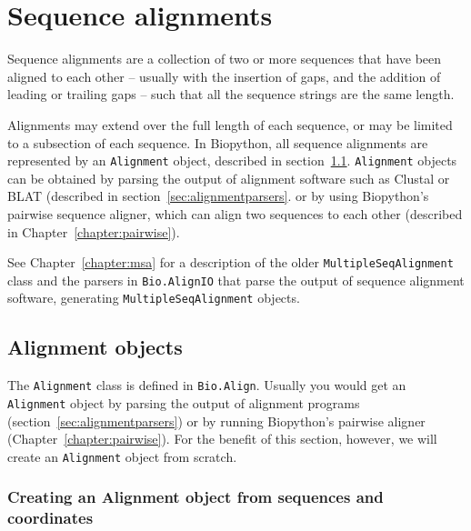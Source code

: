 \chapter{Sequence alignments}
\label{chapter:align}

Sequence alignments are a collection of two or more sequences that have been aligned to each other -- usually with the insertion of gaps, and the addition of leading or trailing gaps -- such that all the sequence strings are the same length.

Alignments may extend over the full length of each sequence, or may be limited to a subsection of each sequence. In Biopython, all sequence alignments are represented by an \verb|Alignment| object, described in section~\ref{sec:alignmentobject}. \verb|Alignment| objects can be obtained by parsing the output of alignment software such as Clustal or BLAT (described in section~\ref{sec:alignmentparsers}. or by using Biopython's pairwise sequence aligner, which can align two sequences to each other (described in Chapter~\ref{chapter:pairwise}).

See Chapter~\ref{chapter:msa} for a description of the older \verb|MultipleSeqAlignment| class and the parsers in \verb|Bio.AlignIO| that parse the output of sequence alignment software, generating \verb|MultipleSeqAlignment| objects.

\section{Alignment objects}
\label{sec:alignmentobject}

The \verb|Alignment| class is defined in \verb|Bio.Align|. Usually you would get an \verb|Alignment| object by parsing the output of alignment programs (section~\ref{sec:alignmentparsers}) or by running Biopython's pairwise aligner (Chapter~\ref{chapter:pairwise}). For the benefit of this section, however, we will create an \verb|Alignment| object from scratch.

\subsection{Creating an Alignment object from sequences and coordinates}
\label{seq:align_sequences_coordinates}

